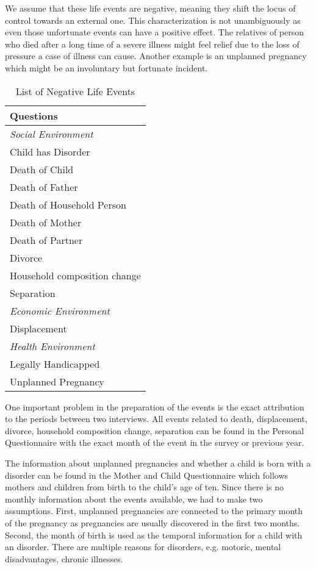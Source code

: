 \documentclass[12pt, a4paper, fleqn, parskip]{scrartcl}
\newcommand{\rowgroup}[1]{\hspace{-1em}#1}  %
\begin{document}
We assume that these life events are negative, meaning they shift the locus of control
towards an external one. This characterization is not unambiguously as even those
unfortunate events can have a positive effect. The relatives of person who died after a
long time of a severe illness might feel relief due to the loss of pressure a case of
illness can cause. Another example is an unplanned pregnancy which might be an
involuntary but fortunate incident.

\begin{table}[H]
    \caption{List of Negative Life Events}
    \label{tab:negative_life_events}
    \centering

    \begin{tabular}{>{\quad}l}
    \toprule
    Questions\\
    \midrule
    \rule{0pt}{2.5ex}\rowgroup{\textit{Social Environment}} \\
    Child has Disorder\\
    Death of Child\\
    Death of Father\\
    Death of Household Person\\
    Death of Mother\\
    Death of Partner\\
    Divorce\\
    Household composition change\\
    Separation\\
    \rule{0pt}{2.5ex}\rowgroup{\textit{Economic Environment}} \\
    Displacement\\
    \rule{0pt}{2.5ex}\rowgroup{\textit{Health Environment}} \\
    Legally Handicapped\\
    Unplanned Pregnancy\\
    \bottomrule
    \end{tabular}
\end{table}

One important problem in the preparation of the events is the exact attribution to the
periods between two interviews. All events related to death, displacement, divorce,
household composition change, separation can be found in the Personal Questionnaire with
the exact month of the event in the survey or previous year.

The information about unplanned pregnancies and whether a child is born with a disorder
can be found in the Mother and Child Questionnaire which follows mothers and children
from birth to the child's age of ten. Since there is no monthly information about the
events available, we had to make two assumptions. First, unplanned pregnancies are
connected to the primary month of the pregnancy as pregnancies are usually discovered in
the first two months. Second, the month of birth is used as the temporal information for
a child with an disorder. There are multiple reasons for disorders, e.g. motoric, mental
disadvantages, chronic illnesses.
\end{document}
